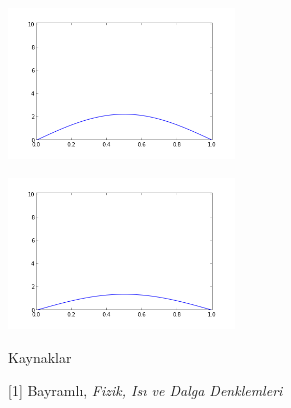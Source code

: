 \documentclass[12pt,fleqn]{article}\usepackage{../../common}
\begin{document}
\includegraphics[height=4cm]{heat-2-60.png}

\includegraphics[height=4cm]{heat-2-80.png}

Kaynaklar

[1] Bayramlı, {\em Fizik, Isı ve Dalga Denklemleri}
\end{document}
